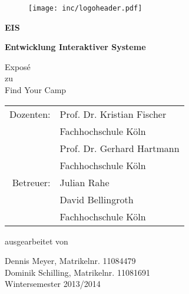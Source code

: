 
\begin{titlepage}

\begin{center}

\begin{figure}[!ht]
	\centering
		\texttt{[image: inc/logoheader.pdf]}
\end{figure}

\vspace{3.0cm}

\begin{Huge}
	\textbf{EIS}\\
\end{Huge}

\vspace{0.1cm}

\begin{huge}
	\textbf{Entwicklung Interaktiver Systeme}\\
\end{huge}

\vspace{0.8cm}

\begin{LARGE}
	Exposé\\
	\vspace{0.1cm}
	zu\\
	\vspace{0.1cm}
	Find Your Camp\\
\end{LARGE}

\vspace{2.5cm}

\begin{tabular}{rl}
      Dozenten:  &  Prof. Dr. Kristian Fischer\\
       			 &  \small Fachhochschule Köln \\[1.0em]
                 &  Prof. Dr. Gerhard Hartmann\\
       			 &  \small Fachhochschule Köln \\[1.0em]
      Betreuer:  &  Julian Rahe\\
				 &  David Bellingroth\\
       			 &  \small Fachhochschule Köln\\
\end{tabular}

\vspace{2.0cm}

\begin{large}
	ausgearbeitet von\\
	\vspace{0.2cm}
\end{large}

\begin{Large}
	Dennis Meyer, Matrikelnr. 11084479\\
	Dominik Schilling, Matrikelnr. 11081691\\
	\vspace{1cm}
	Wintersemester 2013/2014
\end{Large}

\end{center}

\end{titlepage}
